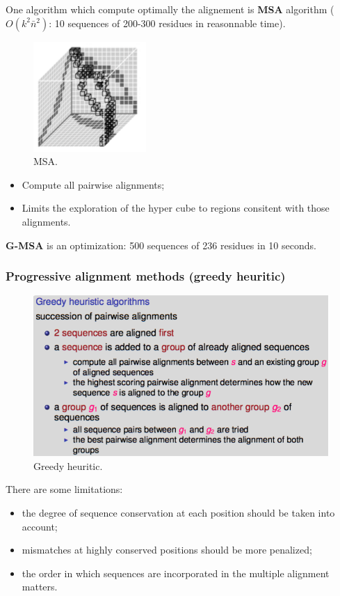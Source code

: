 One algorithm which compute optimally the alignement is \textbf{MSA} algorithm ($O(k^2 \bar{n}^2)$: 10 sequences of 200-300 residues in reasonnable time).
\begin{figure}[htp]
	\centering
	\includegraphics[scale=0.5]{images/34_msa.png}
	\caption{MSA.}
\end{figure}

\begin{itemize}
	\item Compute all pairwise alignments;
	\item Limits the exploration of the hyper cube to regions consitent with those alignments.
\end{itemize}

\textbf{G-MSA} is an optimization: 500 sequences of 236 residues in 10 seconds.

\subsubsection{Progressive alignment methods (greedy heuritic)}

\begin{figure}[htp]
	\centering
	\includegraphics[scale=0.5]{images/35_greedy.png}
	\caption{Greedy heuritic.}
\end{figure}

There are some limitations:
\begin{itemize}
	\item the degree of sequence conservation at each position should be taken into account;
	\item mismatches at highly conserved positions should be more penalized;
	\item the order in which sequences are incorporated in the multiple alignment matters.
\end{itemize}
\newpage
